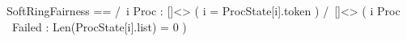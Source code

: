 \documentclass[msc]{mestrado}
\begin{document}
\begin{notla}
SoftRingFairness == 
      /\ \A i \in Proc : []<> ( i = ProcState[i].token )
      /\ []<> ( \A i \in Proc \ Failed : Len(ProcState[i].list) = 0 )
\end{notla}
\begin{tlatex}
%
\end{tlatex}
\end{document}
